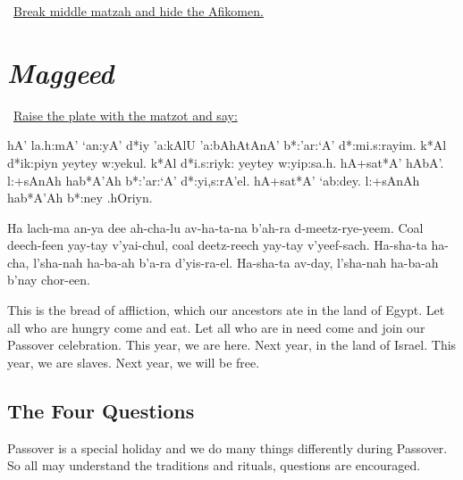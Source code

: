 \documentclass[12pt]{article}
\newenvironment{hebrewPrayer}
    {\begin{cjhebrew}
     \Large
    }
    {
    \end{cjhebrew}
    }
\newenvironment{hebrewTransliteration}{}{\par}
\newenvironment{hebrewTranslation}{}{\par}
\newcommand{\stepMaggeedEn}{Maggeed}
\newcommand{\stepMaggeedHe}{mag*iyd}
\newcommand{\inlineSederAction}[1]{\faHandORight{}~\underline{#1}}
\newcommand{\sederAction}[1]{\inlineSederAction{#1}\par}
\newcommand{\sederSection}[2]{
    \section*{{\Huge \cjRL{#2}} \textit{#1}}
}
\begin{document}
\sederAction{Break middle matzah and hide the Afikomen.}

\begin{minipage}[t]{\textwidth}
    \sederSection{\stepMaggeedEn}{\stepMaggeedHe}
    \sederAction{Raise the plate with the matzot and say:}
    \begin{hebrewPrayer}
        hA' la.h:mA' `an:yA' d*iy 'a:kAlU 'a:bAhAtAnA' b*:'ar:`A' d*:mi.s:rayim\textrm{.} k*Al d*ik:piyn yeytey w:yekul\textrm{.} k*Al d*i.s:riyk: yeytey w:yip:sa.h\textrm{.} hA+sat*A' hAbA'\textrm{.} l:+sAnAh hab*A'Ah b*:'ar:`A' d*:yi,s:rA'el\textrm{.} hA+sat*A' `ab:dey\textrm{.} l:+sAnAh hab*A'Ah b*:ney .hOriyn\textrm{.}
    \end{hebrewPrayer}

    \begin{hebrewTransliteration}
        Ha lach-ma an-ya dee ah-cha-lu av-ha-ta-na b'ah-ra d-meetz-rye-yeem. Coal deech-feen yay-tay v'yai-chul, coal deetz-reech yay-tay v'yeef-sach. Ha-sha-ta ha-cha, l'sha-nah ha-ba-ah b'a-ra d'yis-ra-el. Ha-sha-ta av-day, l'sha-nah ha-ba-ah b'nay chor-een.
    \end{hebrewTransliteration}

    \begin{hebrewTranslation}
        This is the bread of affliction, which our ancestors ate in the land of Egypt. Let all who are hungry come and eat. Let all who are in need come and join our Passover celebration. This year, we are here. Next year, in the land of Israel. This year, we are slaves. Next year, we will be free.
    \end{hebrewTranslation}
\end{minipage}

\subsection*{The Four Questions}
Passover is a special holiday and we do many things differently during Passover.  So all may understand the traditions and rituals, questions are encouraged.
\end{document}
